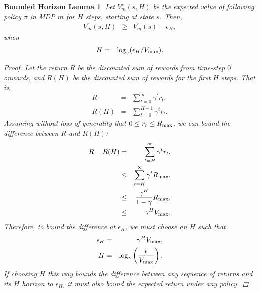 \newtheorem*{horizonlemma}{Bounded Horizon Lemma}
\begin{horizonlemma}
Let $V^\pi_m(s,H)$ be the expected value of following policy $\pi$ in MDP $m$ for $H$ steps, starting at state $s$. Then,
\begin{eqnarray}
V^\pi_m(s,H) &\geq& V^\pi_m(s) - \epsilon_H,
\end{eqnarray}
when
\begin{eqnarray}
H&=&\log_\gamma(\epsilon_H/V_{\rm max}).
\end{eqnarray}

\begin{proof}
Let the return $R$ be the discounted sum of rewards from time-step $0$ onwards, and $R(H)$ be the discounted sum of rewards for the first $H$ steps. That is,
\begin{eqnarray}
R &=& \sum_{t=0}^\infty \gamma^t r_t,\\
R(H) &=& \sum_{t=0}^{H-1} \gamma^t r_t.
\end{eqnarray}
Assuming without loss of generality that $0\leq r_t \leq R_{\rm max}$, we can bound the difference between $R$ and $R(H)$:
\begin{eqnarray}
R - R(H) &=& \sum_{t=H}^\infty \gamma^t r_t,\\
 &\leq& \sum_{t=H}^\infty \gamma^t R_{\rm max},\\
 &\leq& \frac {\gamma^H} {1-\gamma} R_{\rm max},\\
 &\leq& \gamma^H V_{\rm max}.
\end{eqnarray}
Therefore, to bound the difference at $\epsilon_H$, we must choose an $H$ such that
\begin{eqnarray}
\epsilon_H &=& \gamma^H V_{\rm max},\\
H &=& \log_\gamma\left(\frac{\epsilon}{V_{\rm max}}\right).
\end{eqnarray}
If choosing $H$ this way bounds the difference between any sequence of returns and its $H$ horizon to $\epsilon_H$, it must also bound the expected return under any policy.
\end{proof}


\end{horizonlemma}

